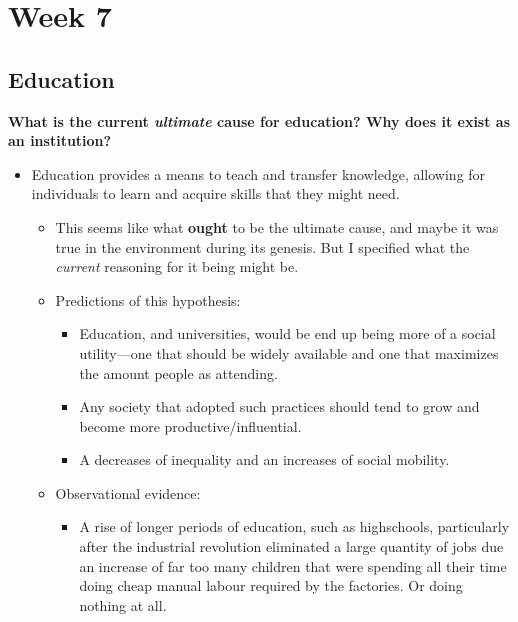 \documentclass[12pt,a4paper]{article}
\begin{document}
\clearpage
\section*{Week 7}

\subsection{Education}
\textbf{What is the current \textit{ultimate} cause for education? Why does it exist as an institution? }
\begin{itemize}
    \item Education provides a means to teach and transfer knowledge, allowing for individuals to learn and acquire skills that they might need.
        \begin{itemize}
            \item This seems like what \textbf{ought} to be the ultimate cause, and maybe it was true in the environment during its genesis. But I specified what the \textit{current} reasoning for it being might be.
            \item Predictions of this hypothesis:
                \begin{itemize}
                    \item Education, and universities, would be end up being more of a social utility---one that should be widely available and one that maximizes the amount people as attending. 
                    \item Any society that adopted such practices should tend to grow and become more productive/influential.
                    \item A decreases of inequality and an increases of social mobility.
                \end{itemize}
            \item Observational evidence:
                \begin{itemize}
                    \item A rise of longer periods of education, such as highschools, particularly after the industrial revolution eliminated a large quantity of jobs due an increase of far too many children that were spending all their time doing cheap manual labour required by the factories. Or doing nothing at all. 
                        \begin{itemize}

\end{itemize}
\end{itemize}
\end{itemize}
\end{itemize}
\end{document}

